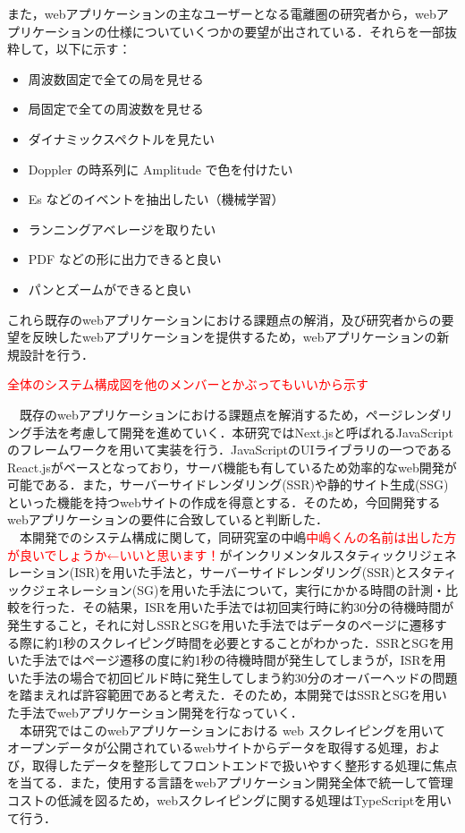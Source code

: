 また，webアプリケーションの主なユーザーとなる電離圏の研究者から，webアプリケーションの仕様についていくつかの要望が出されている．それらを一部抜粋して，以下に示す：
\begin{itemize}
\item 周波数固定で全ての局を見せる
\item 局固定で全ての周波数を見せる
\item ダイナミックスペクトルを見たい
\item Doppler の時系列に Amplitude で色を付けたい
\item Es などのイベントを抽出したい（機械学習）
\item ランニングアベレージを取りたい
\item PDF などの形に出力できると良い
\item パンとズームができると良い
\end{itemize}

これら既存のwebアプリケーションにおける課題点の解消，及び研究者からの要望を反映したwebアプリケーションを提供するため，webアプリケーションの新規設計を行う．

\textcolor{red}{全体のシステム構成図を他のメンバーとかぶってもいいから示す}

　既存のwebアプリケーションにおける課題点を解消するため，ページレンダリング手法を考慮して開発を進めていく．本研究ではNext.jsと呼ばれるJavaScriptのフレームワークを用いて実装を行う．JavaScriptのUIライブラリの一つであるReact.jsがベースとなっており，サーバ機能も有しているため効率的なweb開発が可能である．また，サーバーサイドレンダリング(SSR)や静的サイト生成(SSG)といった機能を持つwebサイトの作成を得意とする．そのため，今回開発するwebアプリケーションの要件に合致していると判断した．\cite{next}\\
　本開発でのシステム構成に関して，同研究室の中嶋\textcolor{red}{中嶋くんの名前は出した方が良いでしょうか←いいと思います！}がインクリメンタルスタティックリジェネレーション(ISR)を用いた手法と，サーバーサイドレンダリング(SSR)とスタティックジェネレーション(SG)を用いた手法について，実行にかかる時間の計測・比較を行った．その結果，ISRを用いた手法では初回実行時に約30分の待機時間が発生すること，それに対しSSRとSGを用いた手法ではデータのページに遷移する際に約1秒のスクレイピング時間を必要とすることがわかった．SSRとSGを用いた手法ではページ遷移の度に約1秒の待機時間が発生してしまうが，ISRを用いた手法の場合で初回ビルド時に発生してしまう約30分のオーバーヘッドの問題を踏まえれば許容範囲であると考えた．そのため，本開発ではSSRとSGを用いた手法でwebアプリケーション開発を行なっていく．\cite{shu_sotsuken}\\
　本研究ではこのwebアプリケーションにおける web スクレイピングを用いてオープンデータが公開されているwebサイトからデータを取得する処理，および，取得したデータを整形してフロントエンドで扱いやすく整形する処理に焦点を当てる．また，使用する言語をwebアプリケーション開発全体で統一して管理コストの低減を図るため，webスクレイピングに関する処理はTypeScriptを用いて行う．\\


